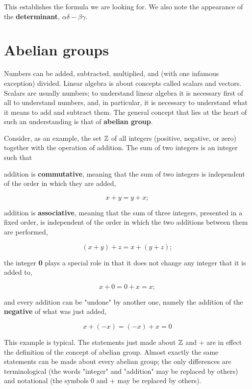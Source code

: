 This establishes the formula we are looking for. We also note the appearance of the \textbf{determinant}, $\alpha\delta - \beta\gamma$.

\section{Abelian groups}

Numbers can be added, subtracted, multiplied, and (with one infamous exception) divided. Linear algebra is about concepts called scalars and vectors. Scalars are usually numbers; to understand linear algebra it is necessary first of all to understand numbers, and, in particular, it is necessary to understand what it means to add and subtract them. The general concept that lies at the heart of such an understanding is that of \textbf{abelian group}.

Consider, as an example, the set $\mathbb{Z}$ of all integers (positive, negative, or zero) together with the operation of addition. The sum of two integers is an integer such that

\quad addition is \textbf{commutative}, meaning that the sum of two integers is independent of the order in which they are added,

\begin{equation}
    x + y = y + x;
\end{equation}

\quad addition is \textbf{associative}, meaning that the sum of three integers, presented in a fixed order, is independent of the order in which the two additions between them are performed,

\begin{equation}
    (x + y) + z = x + (y + z);
\end{equation}

\quad the integer \textbf{0} plays a special role in that it does not change any integer that it is added to,

\begin{equation}
    x + 0 = 0 + x = x;
\end{equation}

\quad and every addition can be "undone" by another one, namely the addition of the \textbf{negative} of what was just added,

\begin{equation}
    x + (-x) = (-x) + x = 0
\end{equation}

This example is typical. The statements just made about $\mathbb{Z}$ and + are in effect the definition of the concept of abelian group. Almost exactly the same statements can be made about every abelian group; the only differences are terminological (the words "integer" and "addition" may be replaced by others) and notational (the symbols 0 and + may be replaced by others).

